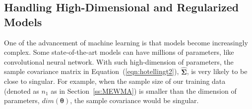\documentclass[twoside,11pt]{article}
\begin{document}



\subsection{Handling High-Dimensional and Regularized Models}
\label{ss:high_dim_score}
One of the advancement of machine learning is that models become increasingly complex. Some state-of-the-art models can have millions of parameters, like convolutional neural network. With such high-dimension of parameters, the sample covariance matrix in Equation~(\ref{eqn:hotellingt2}), $\hat {\bm { \Sigma}}$, is very likely to be close to singular. For example, when the sample size of our training data (denoted as $n_1$ as in Section~\ref{ss:MEWMA}) is smaller than the dimension of parameters, $dim(\bm { \theta})$, the sample covariance would be singular. 
\end{document}
